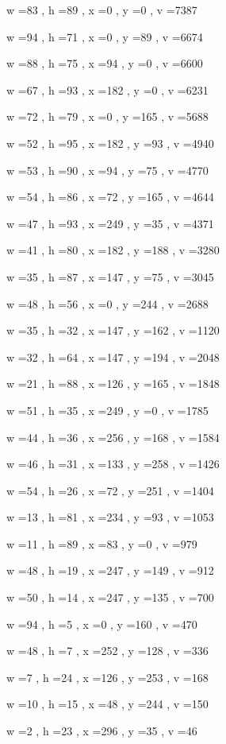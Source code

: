 \documentclass[11pt]{article}
\begin{document}
w =83 , h =89 , x =0 , y =0 , v =7387
\par
w =94 , h =71 , x =0 , y =89 , v =6674
\par
w =88 , h =75 , x =94 , y =0 , v =6600
\par
w =67 , h =93 , x =182 , y =0 , v =6231
\par
w =72 , h =79 , x =0 , y =165 , v =5688
\par
w =52 , h =95 , x =182 , y =93 , v =4940
\par
w =53 , h =90 , x =94 , y =75 , v =4770
\par
w =54 , h =86 , x =72 , y =165 , v =4644
\par
w =47 , h =93 , x =249 , y =35 , v =4371
\par
w =41 , h =80 , x =182 , y =188 , v =3280
\par
w =35 , h =87 , x =147 , y =75 , v =3045
\par
w =48 , h =56 , x =0 , y =244 , v =2688
\par
w =35 , h =32 , x =147 , y =162 , v =1120
\par
w =32 , h =64 , x =147 , y =194 , v =2048
\par
w =21 , h =88 , x =126 , y =165 , v =1848
\par
w =51 , h =35 , x =249 , y =0 , v =1785
\par
w =44 , h =36 , x =256 , y =168 , v =1584
\par
w =46 , h =31 , x =133 , y =258 , v =1426
\par
w =54 , h =26 , x =72 , y =251 , v =1404
\par
w =13 , h =81 , x =234 , y =93 , v =1053
\par
w =11 , h =89 , x =83 , y =0 , v =979
\par
w =48 , h =19 , x =247 , y =149 , v =912
\par
w =50 , h =14 , x =247 , y =135 , v =700
\par
w =94 , h =5 , x =0 , y =160 , v =470
\par
w =48 , h =7 , x =252 , y =128 , v =336
\par
w =7 , h =24 , x =126 , y =253 , v =168
\par
w =10 , h =15 , x =48 , y =244 , v =150
\par
w =2 , h =23 , x =296 , y =35 , v =46
\par
\newpage
\end{document}
